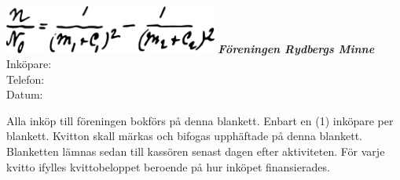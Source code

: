 \documentclass[12pt]{article}
\begin{document}
\pagestyle{empty}
\begin{minipage}[t]{0.5\textwidth}
    \includegraphics[width=7cm]{rydberg.pdf}
    \large\textbf{\textit{Föreningen Rydbergs Minne}}
    \vspace{20mm}\\\Large
    Inköpare: \hrulefill\\[8pt]
    Telefon: \hrulefill\\[8pt]
    Datum: \hrulefill
\end{minipage}
\hfill
\begin{minipage}[t]{0.4\textwidth}
    \vspace*{-15mm}
    Alla inköp till föreningen bokförs på denna blankett. Enbart en (1) inköpare per blankett. Kvitton skall märkas och bifogas upphäftade på denna blankett. Blanketten lämnas sedan till kassören senast dagen efter aktiviteten. För varje kvitto ifylles kvittobeloppet beroende på hur inköpet finansierades.
\end{minipage}
\end{document}
